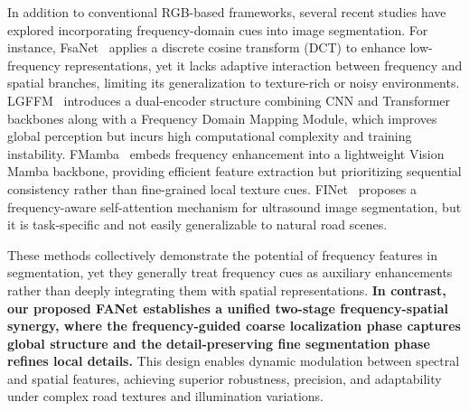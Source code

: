 \documentclass[journal]{IEEEtran}
\begin{document}
In addition to conventional RGB-based frameworks, several recent studies have explored incorporating frequency-domain cues into image segmentation. 
For instance, FsaNet~\cite{DBLP:journals/tip/ZhangPG23} applies a discrete cosine transform (DCT) to enhance low-frequency representations, 
yet it lacks adaptive interaction between frequency and spatial branches, limiting its generalization to texture-rich or noisy environments. 
LGFFM~\cite{11129883TMI} introduces a dual-encoder structure combining CNN and Transformer backbones along with a Frequency Domain Mapping Module, 
which improves global perception but incurs high computational complexity and training instability. 
FMamba~\cite{DBLP:journals/tim/LiuLLWZS25} embeds frequency enhancement into a lightweight Vision Mamba backbone, 
providing efficient feature extraction but prioritizing sequential consistency rather than fine-grained local texture cues. 
FINet~\cite{DBLP:journals/tcsv/WangZZGY25} proposes a frequency-aware self-attention mechanism for ultrasound image segmentation, 
but it is task-specific and not easily generalizable to natural road scenes.




These methods collectively demonstrate the potential of frequency features in segmentation, 
yet they generally treat frequency cues as auxiliary enhancements rather than deeply integrating them with spatial representations. 
\textbf{In contrast, our proposed FANet establishes a unified two-stage frequency-spatial synergy, 
where the frequency-guided coarse localization phase captures global structure and the detail-preserving fine segmentation phase refines local details.} 
This design enables dynamic modulation between spectral and spatial features, achieving superior robustness, precision, and adaptability under complex road textures and illumination variations.
\end{document}
